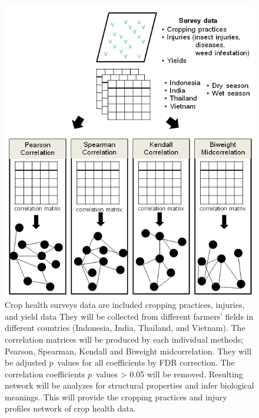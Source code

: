 \begin{figure}
\centering
\includegraphics[width = 6in]{pipeline}
\caption[Network method for characterizing interactions between injury profiles and cropping practices using correlation measures]{Crop health surveys data are included cropping practices, injuries, and yield data They will be collected from different farmers' fields in different countries (Indonesia, India, Thailand, and Vietnam). The correlation matrices will be produced by each individual methods; Pearson, Spearman, Kendall and Biweight midcorrelation. They will be adjusted $p$~values for all coefficients by FDR correction. The correlation coefficients $p$~values > 0.05 will be removed. Resulting network will be  analyzes for structural properties and infer biological meanings. This will provide the cropping practices and injury profiles network of crop health data.}
\end{figure}

